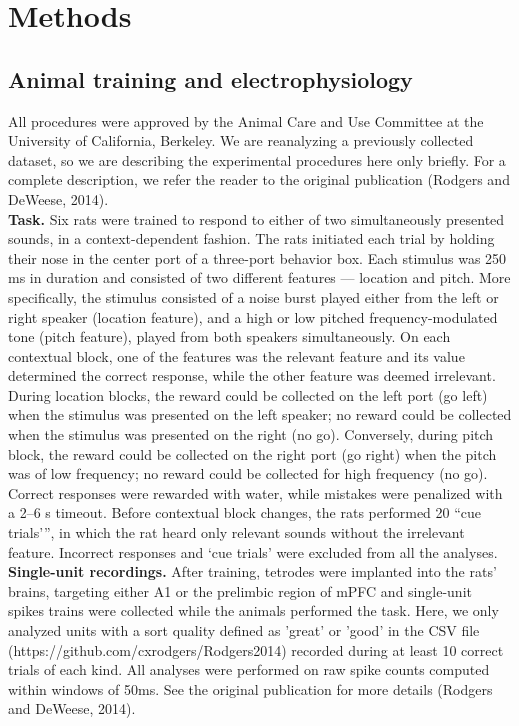 \documentclass[12pt]{article}
\begin{document}
\section*{Methods}
\subsection*{Animal training and electrophysiology}
All procedures were approved by the Animal Care and Use Committee at the University of California, Berkeley.  We are reanalyzing a previously collected dataset, so we are describing the experimental procedures here only briefly. For a complete description, we refer the reader to the original publication (Rodgers and DeWeese, 2014). \\


\textbf{Task.} Six rats were trained to respond to either of two simultaneously presented sounds, in a context-dependent fashion. The rats initiated each trial by holding their nose in the center port of a three-port behavior box. Each stimulus was 250 ms in duration and consisted of two different features — location and pitch. More specifically, the stimulus consisted of a noise burst played either from the left or right speaker (location feature), and a high or low pitched frequency-modulated tone (pitch feature), played from both speakers simultaneously. On each contextual block, one of the features was the relevant feature and its value determined the correct response, while the other feature was deemed irrelevant. During location blocks, the reward could be collected on the left port (go left) when the stimulus was presented on the left speaker; no reward could be collected when the stimulus was presented on the right (no go). Conversely, during pitch block, the reward could be collected on the right port (go right) when the pitch was of low frequency; no reward could be collected for high frequency (no go). Correct responses were rewarded with water, while mistakes were penalized with a 2–6 s timeout. Before contextual block changes, the rats performed 20 “cue trials'”, in which the rat heard only relevant sounds without the irrelevant feature. Incorrect responses and ‘cue trials’ were excluded from all the analyses. \\


\textbf{Single-unit recordings.} After training, tetrodes were implanted into the rats’ brains, targeting either A1 or the prelimbic region of mPFC and single-unit spikes trains were collected while the animals performed the task. Here, we only analyzed units with a sort quality defined as 'great' or 'good' in the CSV file (https://github.com/cxrodgers/Rodgers2014) recorded during at least 10 correct trials of each kind. All analyses were performed on raw spike counts computed within windows of 50ms. See the original publication for more details (Rodgers and DeWeese, 2014). 
\end{document}
